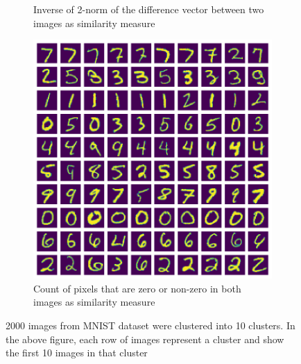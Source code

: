 \documentclass[10pt,a4paper, nocenter]{report}
\begin{document}
\begin{enumerate}
\begin{figure}[h]
\begin{center}
\begin{subfigure}[b]{0.3\textwidth}
                    \caption{Inverse of 2-norm of the difference vector between two images as similarity measure}
                    \label{fig:clustering_10_2norm}
                \end{subfigure}           
                \begin{subfigure}[b]{0.3\textwidth}
                    \centering
                    \includegraphics[width=\textwidth]{../../images/number_clustering_10_hamming.png}
                    \caption{Count of pixels that are zero or non-zero in both images as similarity measure}
                    \label{fig:clustering_10_hamming}
                \end{subfigure}           
            \end{center}
            \caption{2000 images from MNIST dataset were clustered into 10 clusters. In the above figure, each row of images represent a cluster and show the first 10 images in that cluster}
            \label{fig:mnist10ClusterImages}
        \end{figure}


\end{enumerate}
\end{document}
